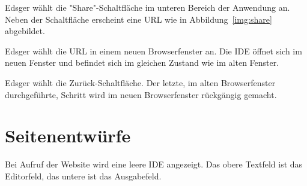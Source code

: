 \documentclass[parskip=full,11pt,twoside]{scrartcl}
\begin{document}
{Edsger wählt die "Share"-Schaltfläche im unteren Bereich der Anwendung an.}
{Neben der Schaltfläche erscheint eine URL wie in Abbildung~\ref{img:share}
abgebildet.}

{Edsger wählt die URL in einem neuen Browserfenster an.}
{Die IDE öffnet sich im neuen Fenster und befindet sich im gleichen Zustand wie im
alten Fenster.}

{Edsger wählt die Zurück-Schaltfläche.}
{Der letzte, im alten Browserfenster durchgeführte, Schritt wird im neuen Browserfenster
rückgängig gemacht.}

%
%
%

\pagebreak
\appendix

\section{Seitenentwürfe}


Bei Aufruf der Website wird eine leere IDE angezeigt. Das obere Textfeld ist das Editorfeld, das untere ist das Ausgabefeld.
\end{document}
